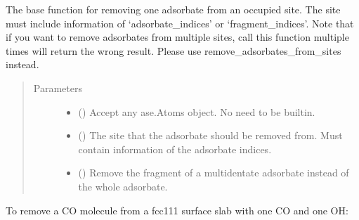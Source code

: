 \documentclass[letterpaper,10pt,english]{sphinxmanual}
\begin{document}
\begin{fulllineitems}
\label{\detokenize{build:acat.build.actions.remove_adsorbate_from_site}}
The base function for removing one adsorbate from an
occupied site. The site must include information of
‘adsorbate\_indices’ or ‘fragment\_indices’. Note that if
you want to remove adsorbates from multiple sites, call
this function multiple times will return the wrong result.
Please use remove\_adsorbates\_from\_sites instead.
\begin{quote}\begin{description}
\item[{Parameters}] \leavevmode\begin{itemize}
\item {} 
 () \textendash{} Accept any ase.Atoms object. No need to be built\sphinxhyphen{}in.

\item {} 
 () \textendash{} The site that the adsorbate should be removed from.
Must contain information of the adsorbate indices.

\item {} 
 (\sphinxstyleliteralemphasis{\sphinxupquote{, }}) \textendash{} Remove the fragment of a multidentate adsorbate instead
of the whole adsorbate.

\end{itemize}

\end{description}\end{quote}

\end{fulllineitems}



To remove a CO molecule from a fcc111 surface slab with one
CO and one OH:
\end{document}
